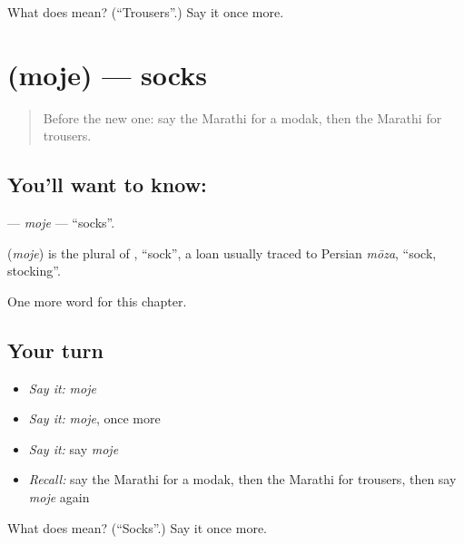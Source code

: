 \begin{tcolorbox}[breakable,colback=teal!4,colframe=teal!35!black,title={Before you move on}]
What does  mean? (\textquotedblleft{}Trousers\textquotedblright{}.) Say it once more.
\end{tcolorbox}
\section[\texorpdfstring{\mr{मोजे} (moje)}{मोजे (moje)}]{ (moje) — socks}

\label{lesson:MR-C187-moje}



\begin{quote}
Before the new one: say the Marathi for a modak, then the Marathi for trousers.
\end{quote}

\subsection*{You'll want to know: }
\textbf{} — \emph{moje} — \textquotedblleft{}socks\textquotedblright{}.

\begin{cousinweb}
\textbf{} (\emph{moje}) is the plural of \textbf{}, \textquotedblleft{}sock\textquotedblright{}, a loan usually traced to Persian \emph{mōza}, \textquotedblleft{}sock, stocking\textquotedblright{}.
\end{cousinweb}

\begin{grammarlens}[title={What you've built}]
One more word for this chapter.
\end{grammarlens}

\subsection*{Your turn}
\begin{itemize}
\raggedright
  \item \emph{Say it:} \emph{moje}
  \item \emph{Say it:} \emph{moje}, once more
  \item \emph{Say it:} say \emph{moje}
  \item \emph{Recall:} say the Marathi for a modak, then the Marathi for trousers, then say \emph{moje} again
\end{itemize}

\begin{tcolorbox}[breakable,colback=teal!4,colframe=teal!35!black,title={Before you move on}]
What does  mean? (\textquotedblleft{}Socks\textquotedblright{}.) Say it once more.
\end{tcolorbox}
